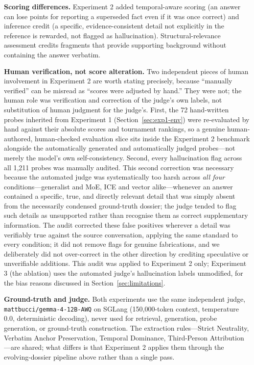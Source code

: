 \documentclass[10pt]{article}
\begin{document}
\textbf{Scoring differences.} Experiment 2 added temporal-aware scoring (an answer can lose points for reporting a superseded fact even if it was once correct) and inference credit (a specific, evidence-consistent detail not explicitly in the reference is rewarded, not flagged as hallucination). Structural-relevance assessment credits fragments that provide supporting background without containing the answer verbatim.

\textbf{Human verification, not score alteration.} Two independent pieces of human involvement in Experiment 2 are worth stating precisely, because ``manually verified'' can be misread as ``scores were adjusted by hand.'' They were not; the human role was verification and correction of the judge's own labels, not substitution of human judgment for the judge's. First, the 72 hand-written probes inherited from Experiment 1 (Section~\ref{sec:exp1-env}) were re-evaluated by hand against their absolute scores and tournament rankings, so a genuine human-authored, human-checked evaluation slice sits inside the Experiment 2 benchmark alongside the automatically generated and automatically judged probes---not merely the model's own self-consistency. Second, every hallucination flag across all 1{,}211 probes was manually audited. This second correction was necessary because the automated judge was systematically too harsh across \emph{all four} conditions---generalist and MoE, ICE and vector alike---whenever an answer contained a specific, true, and directly relevant detail that was simply absent from the necessarily condensed ground-truth dossier; the judge tended to flag such details as unsupported rather than recognise them as correct supplementary information. The audit corrected these false positives wherever a detail was verifiably true against the source conversation, applying the same standard to every condition; it did not remove flags for genuine fabrications, and we deliberately did not over-correct in the other direction by crediting speculative or unverifiable additions. This audit was applied to Experiment 2 only; Experiment 3 (the ablation) uses the automated judge's hallucination labels unmodified, for the bias reasons discussed in Section~\ref{sec:limitations}.

\textbf{Ground-truth and judge.} Both experiments use the same independent judge, \texttt{mattbucci/gemma-4-12B-AWQ} on SGLang (150{,}000-token context, temperature 0.0, deterministic decoding), never used for retrieval, generation, probe generation, or ground-truth construction. The extraction rules---Strict Neutrality, Verbatim Anchor Preservation, Temporal Dominance, Third-Person Attribution---are shared; what differs is that Experiment 2 applies them through the evolving-dossier pipeline above rather than a single pass.
\end{document}
